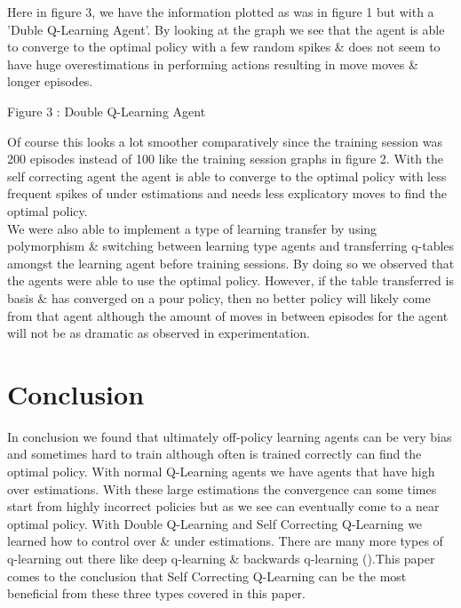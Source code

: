 \documentclass[letterpaper]{article}
\begin{document}
Here in figure 3, we have the information plotted as was in figure 1 but with a 'Duble Q-Learning Agent'.  By looking at the graph we see that the agent is able to converge to the optimal policy with a few random spikes \& does not seem to have huge overestimations in performing actions resulting in move moves \& longer episodes.  
\begin{center}

Figure 3 : Double Q-Learning Agent 
\end{center}
Of course this looks a lot smoother comparatively since the training session was 200 episodes instead of 100 like the training session graphs in figure 2. With the self correcting agent the agent is able to converge to the optimal policy with less frequent spikes of under estimations and needs less explicatory moves to find the optimal policy. \\
We were also able to implement a type of learning transfer by using polymorphism \& switching between learning type agents and transferring q-tables amongst the learning agent before training sessions.  By doing so we observed that the agents were able to use the optimal policy.  However, if the table transferred is basis \& has converged on a pour policy, then no better policy will likely come from that agent although the amount of moves in between episodes for the agent will not be as dramatic as observed in experimentation.  
 
\section{Conclusion}

In conclusion we found that ultimately off-policy learning agents can be very bias and sometimes hard to train although often is trained correctly can find the optimal policy.  With normal Q-Learning agents we have agents that have high over estimations.  With these large estimations the convergence can some times start from highly incorrect policies but as we see can eventually come to a near optimal policy.  With Double Q-Learning and Self Correcting Q-Learning we learned how to control over \& under estimations.  There are many more types of q-learning out there like deep q-learning \& backwards q-learning (\cite{WANG20132184}).This paper comes to the conclusion that Self Correcting Q-Learning can be the most beneficial from these three types covered in this paper. 



\end{document}

